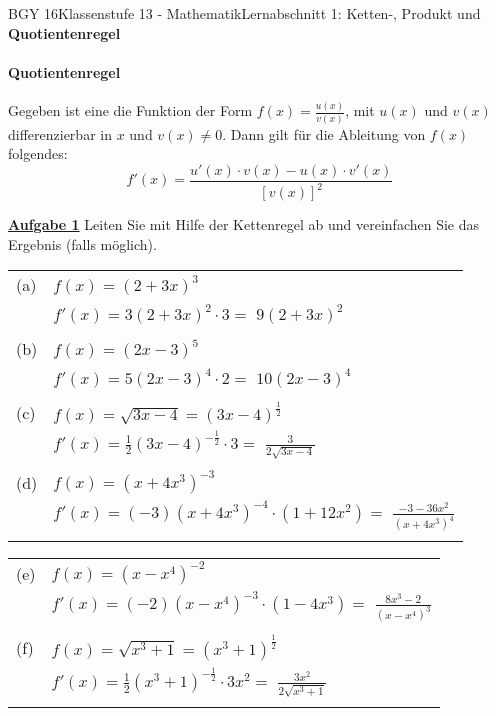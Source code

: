 \documentclass[oneside,openany,headings=optiontotoc,11pt,numbers=noenddot]{scrreprt}
\begin{document}
\begin{worksheet}{BGY 16}{Klassenstufe 13 - Mathematik}{Lernabschnitt 1: Ketten-, Produkt und \textbf{Quotientenregel}}
\begin{framed}
			\paragraph{Quotientenregel} Gegeben ist eine die Funktion der Form \(f(x) = \frac{u(x)}{v(x)}\), mit \(u(x)\) und \(v(x)\) differenzierbar in \(x\) und \(v(x) \neq 0\). Dann gilt für die Ableitung von \(f(x)\) folgendes:
			\[f'(x) = \frac{u'(x)\cdot{}v(x)-u(x)\cdot{}v'(x)}{[v(x)]^2}\]
		\end{framed}
		\begin{framed}
			\noindent
			\textbf{\underline{Aufgabe 1}} Leiten Sie mit Hilfe der Kettenregel ab und vereinfachen Sie das Ergebnis (falls möglich).\\
			\par
			\begin{tabularx}{\textwidth}{lX}
				(a) & \(f(x)=(2+3x)^3\)\\
				& \(f'(x) = 3(2+3x)^2\cdot{}3 =\) \colorbox{green!10}{\(9(2+3x)^2\)}\\
				\\
				(b) & \(f(x) = (2x-3)^5\)\\
				& \(f'(x) = 5(2x-3)^4\cdot{}2 =\) \colorbox{green!10}{\(10(2x-3)^4\)}\\
				\\
				(c) & \(f(x) = \sqrt{3x-4} = (3x-4)^{\frac{1}{2}}\)\\
				& \(f'(x) = \frac{1}{2}(3x-4)^{-\frac{1}{2}}\cdot{}3 = \) \colorbox{green!10}{\(\frac{3}{2\sqrt{3x-4}}\)}\\
				\\
				(d) & \(f(x) = (x+4x^3)^{-3}\)\\
				& \(f'(x) =  (-3)(x+4x^3)^{-4}\cdot{}(1+12x^2) =\) \colorbox{green!10}{\(\frac{-3-36x^2}{(x+4x^3)^4}\)}\\
				\\
			\end{tabularx}
			\begin{tabularx}{\textwidth}{lX}
				(e) & \(f(x) = (x-x^4)^{-2}\)\\
				& \(f'(x) = (-2)(x-x^4)^{-3}\cdot(1-4x^3) =\) \colorbox{green!10}{\(\frac{8x^3-2}{(x-x^4)^3}\)}\\
				\\
				(f) & \(f(x) = \sqrt{x^3+1} = (x^3+1)^{\frac{1}{2}}\)\\
				& \(f'(x) = \frac{1}{2}(x^3+1)^{-\frac{1}{2}}\cdot{}3x^2 =\) \colorbox{green!10}{\(\frac{3x^2}{2\sqrt{x^3+1}}\)}\\
				\\

\end{tabularx}
\end{framed}
\end{worksheet}
\end{document}
